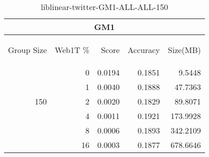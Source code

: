 \begin{center}
\begin{table}[htbp] 
 \begin{center}
\begin{tabular}{ | r | r | r | r | r |}
\hline
\multicolumn{5}{|c|}{GM1}\\
\hline
\begin{sideways}Group Size\end{sideways} & \begin{sideways}Web1T \%\end{sideways} & \begin{sideways}Score\end{sideways} & \begin{sideways}Accuracy\end{sideways} & \begin{sideways}Size(MB)\end{sideways}\\
\hline
\multirow{5}{*}{150}
 & 0 & 0.0194 & 0.1851 & 9.5448\\ \cline{2-5}
 & 1 & 0.0040 & 0.1888 & 47.7363\\ \cline{2-5}
 & 2 & 0.0020 & 0.1829 & 89.8071\\ \cline{2-5}
 & 4 & 0.0011 & 0.1921 & 173.9928\\ \cline{2-5}
 & 8 & 0.0006 & 0.1893 & 342.2109\\ \cline{2-5}
 & 16 & 0.0003 & 0.1877 & 678.6646\\ \cline{2-5}
\hline
\end{tabular}
\caption{liblinear-twitter-GM1-ALL-ALL-150}
\label{table:liblinear-twitter-GM1-ALL-ALL-150}
\end{center}
 \end{table}
\end{center}

